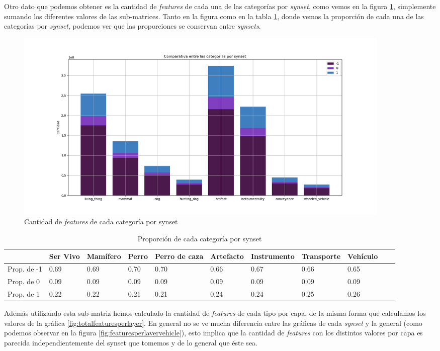 \documentclass[12,twoside]{TFG-GM}
\theoremstyle{definition}
\theoremstyle{remark}
\begin{document}
Otro dato que podemos obtener es la cantidad de \textit{features} de cada una de las categorías por \textit{synset}, como vemos en la figura \ref{fig:totalfeaturespersynset}, simplemente sumando los diferentes valores de las sub-matrices. Tanto en la figura como en la tabla \ref{tab:categorypersynset}, donde vemos la proporción de cada una de las categorías por \textit{synset}, podemos ver que las proporciones se conservan entre \textit{synsets}.


\begin{figure}[ht] 
	\centering
	\includegraphics[width=0.9\textwidth] {Images/plots/25/synsetslayer/Comparative_of_synsets_global.png}
	\caption{ Cantidad de \textit{features} de cada categoría por synset
	\label{fig:totalfeaturespersynset}}
\end{figure}

\begin{table}[]
\centering
\caption{Proporción de cada categoría por synset}
\label{tab:categorypersynset}
\begin{tabular}{|l|l|l|l|l|l|l|l|l|l|l|}
\hline
 & Ser Vivo & Mamífero & Perro & Perro de caza & Artefacto & Instrumento & Transporte & Vehículo \\ \hline
 Prop. de -1 & 0.69 & 0.69 & 0.70 & 0.70 & 0.66 & 0.67 & 0.66 & 0.65 \\ \hline
 Prop. de 0 & 0.09 & 0.09 & 0.09 & 0.09 & 0.09 & 0.09 & 0.09 & 0.09 \\ \hline
 Prop. de 1 & 0.22 & 0.22 & 0.21 & 0.21 & 0.24 & 0.24 & 0.25 & 0.26 \\
\hline
\end{tabular}


\end{table}



Además utilizando esta sub-matriz hemos calculado la cantidad de \textit{features} de cada tipo por capa, de la misma forma que calculamos los valores de la gráfica \ref{fig:totalfeaturesperlayer}. En general no se ve mucha diferencia entre las gráficas de cada \textit{synset} y la general (como podemos observar en la figura \ref{fig:featuresperlayervehicle}), esto implica que la cantidad de \textit{features} con los distintos valores por capa es parecida independientemente del synset que tomemos y de lo general que éste sea.
\end{document}
